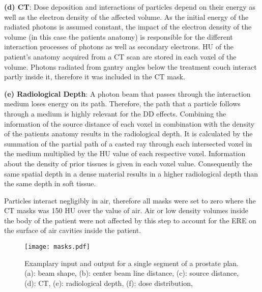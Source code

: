 \begin{hangingpar}
    \item \textbf{(d) CT}: 
    Dose deposition and interactions of particles depend on their energy as well as the electron density of the affected volume. 
    As the initial energy of the radiated photons is assumed constant, the impact of the electron density of the volume (in this case the patients anatomy) is responsible for the different interaction processes of photons as well as secondary electrons. 
    \ac{HU} of the patient's anatomy acquired from a \ac{CT} scan are stored in each voxel of the volume. 
    Photons radiated from gantry angles below the treatment couch interact partly inside it, therefore it was included in the \acs{CT} mask. 
\end{hangingpar}

\begin{hangingpar}\label{par:radiological_depth}
    \item \textbf{(e) Radiological Depth}: 
    A photon beam that passes through the interaction medium loses energy on its path. 
    Therefore, the path that a particle follows through a medium is highly relevant for the \acs{DD} effects. 
    Combining the information of the source distance of each voxel in combination with the density of the patients anatomy results in the radiological depth.
    It is calculated by the summation of the partial path of a casted ray through each intersected voxel in the medium multiplied by the \acs{HU} value of each respective voxel.
    Information about the density of prior tissues is given in each voxel value.
    Consequently the same spatial depth in a dense material results in a higher radiological depth than the same depth in soft tissue.
\end{hangingpar}

Particles interact negligibly in air, therefore all masks were set to zero where the CT masks was 150 \acs{HU} over the value of air. Air or low density volumes inside the body of the patient were not affected by this step to account for the \acs{ERE} on the surface of air cavities inside the patient. 

\begin{figure}
    \centering
    \texttt{[image: masks.pdf]}
    \caption{Examplary input and output for a single segment of a prostate plan. (a): beam shape, (b): center beam line distance, (c): source distance, (d): CT, (e): radiological depth, (f): dose distribution, }\label{fig:masks}
\end{figure}

